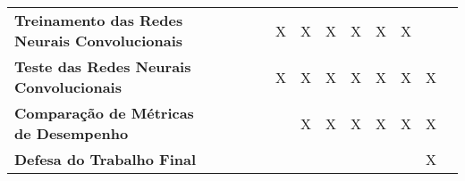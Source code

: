 \begin{table}[!ht]
\begin{center}
\begin{small}
\begin{tabular}{p{5cm}cccccccccccc}
  \textbf{Treinamento das
  Redes Neurais Convolucionais}         &             &             &             &             &      X      &      X      &      X      &      X      &      X      &      X       &            \\
  \textbf{Teste das Redes
  Neurais Convolucionais}               &             &             &             &             &      X      &      X      &      X      &      X      &      X      &      X       &     X      \\
  \textbf{Comparação de Métricas
  de Desempenho}                        &             &             &             &             &             &      X      &      X      &      X      &      X      &      X      &      X      \\
  \textbf{Defesa do Trabalho Final}     &             &             &             &             &             &             &             &             &             &             &      X      \\
  \bottomrule
\end{tabular}
\end{small}
\end{center}
\end{table}
